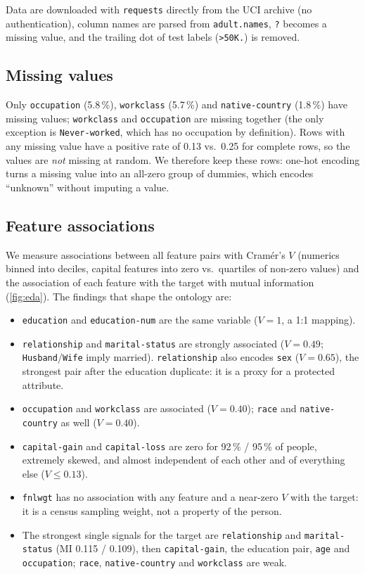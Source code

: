 \documentclass[11pt,a4paper]{article}
\newcommand{\code}[1]{\texttt{#1}}
\begin{document}
Data are downloaded with \code{requests} directly from the UCI archive (no authentication), column names are
parsed from \code{adult.names}, \code{?} becomes a missing value, and the trailing dot of test labels
(\code{>50K.}) is removed.

\subsection{Missing values}
Only \code{occupation} (5.8\,\%), \code{workclass} (5.7\,\%) and \code{native-country} (1.8\,\%) have missing
values; \code{workclass} and \code{occupation} are missing together (the only exception is \code{Never-worked},
which has no occupation by definition). Rows with any missing value have a positive rate of 0.13 vs.\ 0.25 for
complete rows, so the values are \emph{not} missing at random. We therefore keep these rows: one-hot encoding
turns a missing value into an all-zero group of dummies, which encodes ``unknown'' without imputing a value.

\subsection{Feature associations}
We measure associations between all feature pairs with Cram\'er's $V$ (numerics binned into deciles, capital
features into zero vs.\ quartiles of non-zero values) and the association of each feature with the target with
mutual information (\cref{fig:eda}). The findings that shape the ontology are:

\begin{itemize}
  \item \code{education} and \code{education-num} are the same variable ($V = 1$, a 1:1 mapping).
  \item \code{relationship} and \code{marital-status} are strongly associated ($V = 0.49$; \code{Husband}/\code{Wife}
    imply married). \code{relationship} also encodes \code{sex} ($V = 0.65$), the strongest pair after the education
    duplicate: it is a proxy for a protected attribute.
  \item \code{occupation} and \code{workclass} are associated ($V = 0.40$); \code{race} and \code{native-country}
    as well ($V = 0.40$).
  \item \code{capital-gain} and \code{capital-loss} are zero for 92\,\% / 95\,\% of people, extremely skewed, and
    almost independent of each other and of everything else ($V \le 0.13$).
  \item \code{fnlwgt} has no association with any feature and a near-zero $V$ with the target: it is a census
    sampling weight, not a property of the person.
  \item The strongest single signals for the target are \code{relationship} and \code{marital-status}
    (MI 0.115 / 0.109), then \code{capital-gain}, the education pair, \code{age} and \code{occupation};
    \code{race}, \code{native-country} and \code{workclass} are weak.
\end{itemize}
\end{document}
